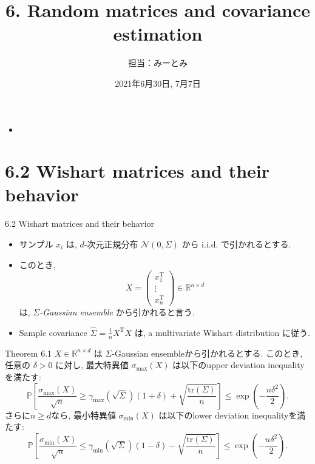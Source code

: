 \documentclass[unicode,aspectratio=169,11pt]{beamer}
\title{6. Random matrices and covariance estimation}
\author{担当：みーとみ}
\date{2021年6月30日, 7月7日}
\newcommand{\bb}{\mathbb}
\newcommand{\tr}{\mathrm{T}}
\newcommand{\trace}{\mathrm{tr}}
\begin{document}
\maketitle

\begin{frame}{}{}
    \begin{itemize}
        \item 
    \end{itemize}
\end{frame}

\section{6.2 Wishart matrices and their behavior}
\begin{frame}{6.2 Wishart matrices and their behavior}
  \begin{itemize}
    \item サンプル $x_i$ は, $d$-次元正規分布 $\mathcal{N}(0, \Sigma)$ から i.i.d. で引かれるとする.
    \item このとき,
    \[
      X =
      \begin{pmatrix}
        x_1^\tr\\
        \vdots\\
        x_n^\tr
      \end{pmatrix} \in \bb{R}^{n \times d}
    \]
    は, {\it $\Sigma$-Gaussian ensemble} から引かれると言う.
    \item Sample covariance $\widehat{\Sigma} = \frac{1}{n}X^\tr X$ は, {a multivariate Wishart distribution} に従う.
  \end{itemize}
\end{frame}

\begin{frame}{}{}
  \begin{block}{Theorem 6.1}
    $X \in \mathbb{R}^{n \times d}$ は $\Sigma$-Gaussian ensembleから引かれるとする.
    このとき, 任意の $\delta > 0$ に対し, 最大特異値 $\sigma_{\max}(X)$ は以下のupper deviation inequalityを満たす:
    \[
      \bb{P} \left[
        \frac{\sigma_{\max}(X)}{\sqrt{n}}
        \ge \gamma_{\max}\left(\sqrt{\Sigma}\right) (1+\delta) + \sqrt{\frac{\trace(\Sigma)}{n}}
      \right]
      \le \exp\left(-\frac{n\delta^2}{2}\right).
      \tag{6.8}
    \]
    さらに$n \ge d$なら, 最小特異値 $\sigma_{\min}(X)$ は以下のlower deviation inequalityを満たす:
    \[
        \bb{P} \left[
        \frac{\sigma_{\min}(X)}{\sqrt{n}}
        \le \gamma_{\min}\left(\sqrt{\Sigma}\right) (1-\delta) - \sqrt{\frac{\trace(\Sigma)}{n}}
      \right]
      \le \exp\left(-\frac{n\delta^2}{2}\right).
      \tag{6.9}
    \]
  \end{block}
\end{frame}
\end{document}
